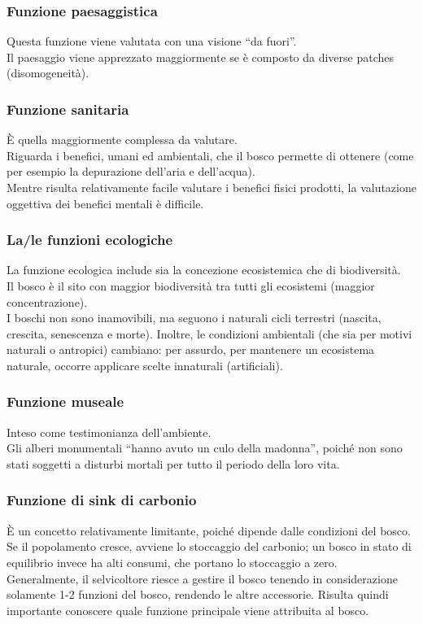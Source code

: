 \subsubsection{Funzione paesaggistica}
Questa funzione viene valutata con una visione ``da fuori''.\\
Il paesaggio viene apprezzato maggiormente se è composto da diverse patches (disomogeneità).
\subsubsection{Funzione sanitaria}
È quella maggiormente complessa da valutare.\\
Riguarda i benefici, umani ed ambientali, che il bosco permette di ottenere (come per esempio la depurazione dell'aria e dell'acqua).\\
Mentre risulta relativamente facile valutare i benefici fisici prodotti, la valutazione oggettiva dei benefici mentali è difficile.
\subsubsection{La/le funzioni ecologiche}
La funzione ecologica include sia la concezione ecosistemica che di biodiversità.\\
Il bosco è il sito con maggior biodiversità tra tutti gli ecosistemi (maggior concentrazione).\\
I boschi non sono inamovibili, ma seguono i naturali cicli terrestri (nascita, crescita, senescenza e morte). Inoltre, le condizioni ambientali (che sia per motivi naturali o antropici) cambiano: per assurdo, per mantenere un ecosistema naturale, occorre applicare scelte innaturali (artificiali). 
\subsubsection{Funzione museale}
Inteso come testimonianza dell'ambiente.\\
Gli alberi monumentali ``hanno avuto un culo della madonna'', poiché non sono stati soggetti a disturbi mortali per tutto il periodo della loro vita.
\subsubsection{Funzione di sink di carbonio}
È un concetto relativamente limitante, poiché dipende dalle condizioni del bosco. Se il popolamento cresce, avviene lo stoccaggio del carbonio; un bosco in stato di equilibrio invece ha alti consumi, che portano lo stoccaggio a zero.
\\[10pt]
Generalmente, il selvicoltore riesce a gestire il bosco tenendo in considerazione solamente 1-2 funzioni del bosco, rendendo le altre accessorie. Risulta quindi importante conoscere quale funzione principale viene attribuita al bosco.
